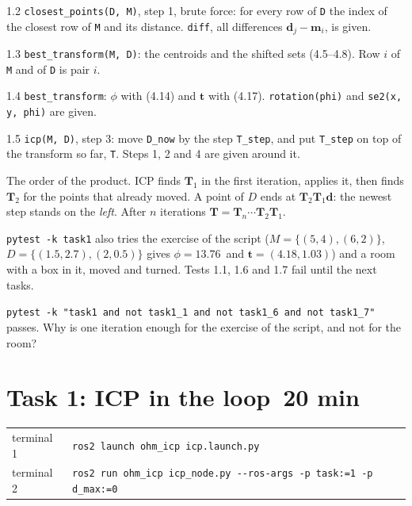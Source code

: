 \documentclass[11pt,a4paper,parskip=half]{scrartcl}
\makeatletter
\newcommand{\thema}[1]{\texttt{#1}}
\newcommand{\minutes}[1]{\hfill{\normalsize\mdseries\color{ohmgrey}\faClock[regular]~#1 min}}
\newcommand{\matsym}[1]{\mathbf{#1}}
\renewcommand{\vec}[1]{\mathbf{#1}}
\newcommand{\running}[2]{\begin{tcolorbox}[base, colback=black!3, borderline west={2.5pt}{0pt}{ohmgrey},
        title={\faTerminal~Running}, coltitle=ohmgrey, colbacktitle=black!3, fonttitle=\small\bfseries,
        toptitle=2pt, bottomtitle=0pt, fontupper=\small]
  \begin{tabularx}{\linewidth}{@{}>{\color{ohmgrey}}l >{\raggedright\arraybackslash}X@{}}
    terminal 1 & \texttt{ros2 launch ohm\_icp icp.launch.py#1} \\
    terminal 2 & \texttt{ros2 run ohm\_icp icp\_node.py -\kern0pt-ros-args #2}
  \end{tabularx}
\end{tcolorbox}}
\makeatother
\begin{document}
\begin{todo}{1.2}
\thema{closest\_points(D, M)}, step 1, brute force: for every row of \thema{D} the index of the closest row of
\thema{M} and its distance. \thema{diff}, all differences \(\vec d_j - \vec m_i\), is given.
\end{todo}

\begin{todo}{1.3}
\thema{best\_transform(M, D)}: the centroids and the shifted sets (4.5--4.8). Row \(i\) of \thema{M} and of
\thema{D} is pair \(i\).
\end{todo}

\begin{todo}{1.4}
\thema{best\_transform}: \(\phi\) with (4.14) and \(\vec t\) with (4.17). \thema{rotation(phi)} and
\thema{se2(x, y, phi)} are given.
\end{todo}

\begin{todo}{1.5}
\thema{icp(M, D)}, step 3: move \thema{D\_now} by the step \thema{T\_step}, and put \thema{T\_step} on top of
the transform so far, \thema{T}. Steps 1, 2 and 4 are given around it.
\end{todo}

\begin{note}
The order of the product. ICP finds \(\matsym T_1\) in the first iteration, applies it, then finds
\(\matsym T_2\) for the points that already moved. A point of \(D\) ends at
\(\matsym T_2 \matsym T_1 \vec d\): the newest step stands on the \emph{left}. After \(n\) iterations
\(\matsym T = \matsym T_n \cdots \matsym T_2 \matsym T_1\).
\end{note}

\thema{pytest -k task1} also tries the exercise of the script (\(M = \{(5,4), (6,2)\}\),
\(D = \{(1.5,2.7), (2,0.5)\}\) gives \(\phi = 13.76\)\,\textdegree{} and \(\vec t = (4.18, 1.03)\)) and a
room with a box in it, moved and turned. Tests 1.1, 1.6 and 1.7 fail until the next tasks.

\begin{checkpoint}
\thema{pytest -k "task1 and not task1\_1 and not task1\_6 and not task1\_7"} passes. Why is one iteration
enough for the exercise of the script, and not for the room?
\end{checkpoint}

\newpage
\section{Task 1: ICP in the loop\minutes{20}}
\label{sec:task1b}
\running{}{-p task:=1 -p d\_max:=0}
\end{document}
